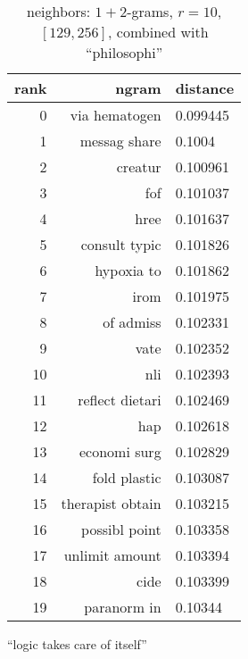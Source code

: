 \begin{table}[ht]
\begin{subtable}[t]{.45\textwidth}
\begin{tabularx}{\textwidth}{r R l}
            \toprule
            rank & ngram & distance\\
            \midrule
            \num{0} & via hematogen & \num{0.099445}\\
            \num{1} & messag share & \num{0.1004}\\
            \num{2} & creatur & \num{0.100961}\\
            \num{3} & fof & \num{0.101037}\\
            \num{4} & hree & \num{0.101637}\\
            \num{5} & consult typic & \num{0.101826}\\
            \midrule
            \num{6} & hypoxia to & \num{0.101862}\\
            \num{7} & irom & \num{0.101975}\\
            \num{8} & of admiss & \num{0.102331}\\
            \num{9} & vate & \num{0.102352}\\
            \num{10} & nli & \num{0.102393}\\
            \num{11} & reflect dietari & \num{0.102469}\\
            \num{12} & hap & \num{0.102618}\\
            \num{13} & economi surg & \num{0.102829}\\
            \num{14} & fold plastic & \num{0.103087}\\
            \num{15} & therapist obtain & \num{0.103215}\\
            \num{16} & possibl point & \num{0.103358}\\
            \num{17} & unlimit amount & \num{0.103394}\\
            \num{18} & cide & \num{0.103399}\\
            \num{19} & paranorm in & \num{0.10344}\\
            \bottomrule
        \end{tabularx}
        \caption{\enquote{logic takes care of itself}}\label{tab:ranking_chance2_2}
    \end{subtable}
    \caption{neighbors: $1+2$-grams, $r = 10$, $[129,256]$, combined with \enquote{philosophi}}\label{tab:ranking_chance2}
\end{table}

